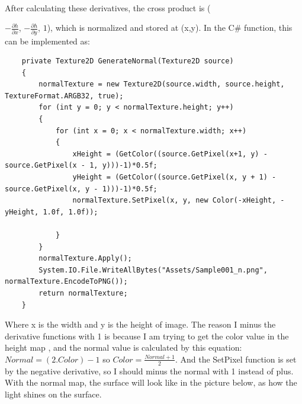\documentclass[a4paper, 13pt]{extarticle}
\begin{document}
\\[0.2cm] After calculating these derivatives, the cross product is ({$-\frac{\partial h}{\partial x}$, $-\frac{\partial h}{\partial y}$, $1$), which is normalized and stored at (x,y). In the C\# function, this can be implemented as: \begin{lstlisting}
	private Texture2D GenerateNormal(Texture2D source)
	{
		normalTexture = new Texture2D(source.width, source.height, TextureFormat.ARGB32, true);
		for (int y = 0; y < normalTexture.height; y++)
		{
			for (int x = 0; x < normalTexture.width; x++)
			{
				xHeight = (GetColor((source.GetPixel(x+1, y) - source.GetPixel(x - 1, y)))-1)*0.5f;
				yHeight = (GetColor((source.GetPixel(x, y + 1) - source.GetPixel(x, y - 1)))-1)*0.5f;
				normalTexture.SetPixel(x, y, new Color(-xHeight, -yHeight, 1.0f, 1.0f));
	
			}
		}
		normalTexture.Apply();
		System.IO.File.WriteAllBytes("Assets/Sample001_n.png", normalTexture.EncodeToPNG());
		return normalTexture;
	}
	\end{lstlisting}
 Where x is the width and y is the height of image. The reason I minus the derivative functions with 1 is because I am trying to get the color value in the height map , and the normal value is calculated by this equation: $ Normal = (2.Color) - 1 $ so $ Color = \frac{Normal + 1}{2}$. And the SetPixel function is set by the negative derivative, so I should minus the normal with 1 instead of plus. With the normal map, the surface will look like in the picture below, as how the light shines on the surface.
 
}
\end{document}
